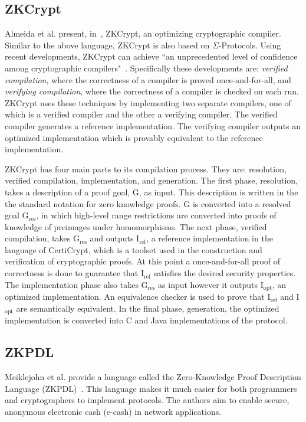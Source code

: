 \documentclass{sig-alternate}
\begin{document}
	\subsection{ZKCrypt}
		Almeida et al. present, in~\cite{ZKCrypt:2012}, ZKCrypt, an optimizing cryptographic
		compiler. Similar to the above language, ZKCrypt is also based on $\Sigma$-Protocols.
		Using recent developments, ZKCrypt can achieve ``an unprecedented level of confidence
		among cryptographic compilers"~\cite{ZKCrypt:2012}. Specifically these developments are:
		\textit{verified compilation}, where the correctness of a compiler is proved once-and-for-all,
		and \textit{verifying compilation}, where the correctness of a compiler is checked on
		each run. ZKCrypt uses these techniques by implementing two separate compilers, one of which
		is a verified compiler and the other a verifying compiler. The verified compiler generates
		a reference implementation. The verifying compiler outputs an optimized implementation
		which is provably equivalent to the reference implementation. 
		
		ZKCrypt has four main parts to its compilation process. They are: resolution, verified
		compilation, implementation, and generation. The first phase, resolution, takes a
		description of a proof goal, G, as input. This description is written in the the standard
		notation for zero knowledge proofs. G is converted into a resolved goal
		G$_{\textrm{res}}$, in which
		high-level range restrictions are converted into proofs of knowledge of preimages under
		homomorphisms. The next phase, verified compilation, takes G$_{\textrm{res}}$ and 
		outputs I$_{\textrm{ref}}$,
		a reference implementation in the language of CertiCrypt, which is a toolset used in
		the construction and verification of cryptographic proofs. At this point a 
		once-and-for-all proof of correctness is done to guarantee that I$_{\textrm{ref}}$
		satisfies the desired security properties. The implementation phase
		also takes G$_{\textrm{res}}$ as input however it outputs I$_{\textrm{opt}}$, an
		optimized implementation. An equivalence checker is used to prove that I$_{\textrm{ref}}$
		and I$_{\textrm{opt}}$ are semantically equivalent. In the final phase, generation,
		the optimized implementation is converted into C and Java implementations of the
		protocol.
				
	\subsection{ZKPDL}
		Meiklejohn et al. provide a language called the Zero-Knowledge Proof Description
		Language (ZKPDL)~\cite{ZKPDL:2010}. This language makes it much easier for both
		programmers and 	cryptographers to implement protocols. The authors aim to enable
		secure, anonymous electronic cash (e-cash) in network applications.
		
\end{document}
